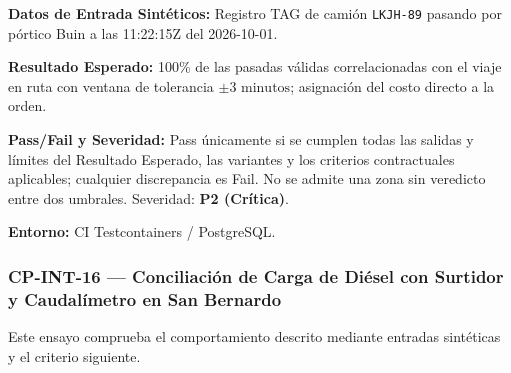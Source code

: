 \par\noindent\textbf{Datos de Entrada Sintéticos:} Registro TAG de camión \texttt{L\allowbreak{}K\allowbreak{}J\allowbreak{}H\allowbreak{}-\allowbreak{}8\allowbreak{}9\allowbreak{}} pasando por pórtico Buin a las 11:22:15Z del 2026-10-01.\par
\par\noindent\textbf{Resultado Esperado:} 100\% de las pasadas válidas correlacionadas con el viaje en ruta con ventana de tolerancia \(\pm 3\text{ minutos}\); asignación del costo directo a la orden.\par
\par\noindent\textbf{Pass/Fail y Severidad:} Pass únicamente si se cumplen todas las salidas y límites del Resultado Esperado, las variantes y los criterios contractuales aplicables; cualquier discrepancia es Fail. No se admite una zona sin veredicto entre dos umbrales. Severidad: \textbf{P2 (Crítica)}.\par
\par\noindent\textbf{Entorno:} CI Testcontainers / PostgreSQL.\par






\subsubsection*{CP-INT-16 — Conciliación de Carga de Diésel con Surtidor y Caudalímetro en San Bernardo}\label{sec:9-cp-int-16}
Este ensayo comprueba el comportamiento descrito mediante entradas sintéticas y el criterio siguiente.

